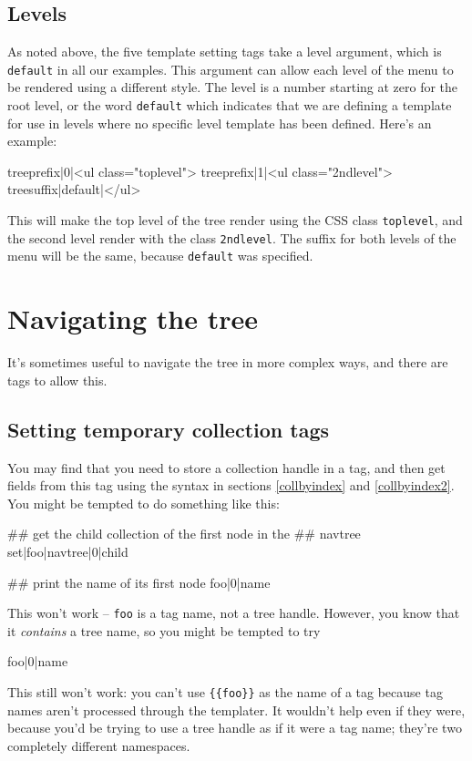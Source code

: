 \subsection{Levels}
As noted above, the five template setting tags take a level argument, which is
\texttt{default} in all our examples. This argument can allow each level of
the menu to be rendered using a different style. The level is a number
starting at zero for the root level, or the word \texttt{default} which
indicates that we are defining a template for use in levels where no specific
level template has been defined. Here's an example:
\begin{MyVerbatim}
 {{treeprefix|0|<ul class="toplevel">}}
 {{treeprefix|1|<ul class="2ndlevel">}}
 {{treesuffix|default|</ul>}}
\end{MyVerbatim}
This will make the top level of the tree render using the CSS class
\texttt{toplevel}, and the second level render with the class
\texttt{2ndlevel}. The suffix for both levels of the menu will be the same,
because \texttt{default} was specified.

\clearpage
\section{Navigating the tree}
\label{treenav}
It's sometimes useful to navigate the tree in more complex ways, and there are
tags to allow this.

\subsection{Setting temporary collection tags}
\label{colltags}
You may find that you need to store a collection handle in a tag, and then get fields from this tag
using the syntax in sections \ref{collbyindex} and \ref{collbyindex2}. You might be tempted to
do something like this:
\begin{MyVerbatim}
## get the child collection of the first node in the
## navtree
{{set|foo|{{navtree|0|child}}}}

## print the name of its first node
{{foo|0|name}}
\end{MyVerbatim}
This won't work -- \texttt{foo} is a tag name, not a tree handle. However, you know that it \emph{contains}
a tree name, so you might be tempted to try
\begin{MyVerbatim}
{{{{foo}}|0|name}}
\end{MyVerbatim}
This still won't work: you can't use \verb,{{foo}}, as the name of a tag because tag names aren't processed
through the templater. It wouldn't help even if they were, because you'd be trying to use a tree handle
as if it were a tag name; they're two completely different namespaces.

